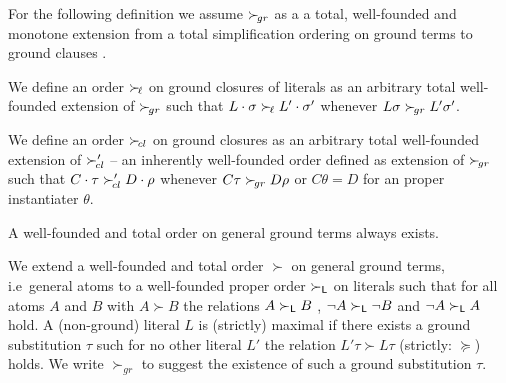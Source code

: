 For the following definition we assume
$\mathrel\succ_{\!gr}$ as a a total, well-founded and monotone extension
from a total simplification ordering on ground terms
to ground clauses \cite{NR2001}.

\begin{definition}
    We define an order $\mathrel\succ_{\!\ell}$ on ground closures of literals
    as an arbitrary total well-founded extension of $\mathrel\succ_{\!gr}$
    such that
    $L\cdot\sigma\mathrel\succ_{\!\ell} L'\cdot\sigma'$ whenever
    $L\sigma\mathrel\succ_{\!gr} L'\sigma'$.

    We define an order \( \mathrel\succ_{\!cl} \) on ground closures
    as an arbitrary total well-founded extension of
    $\mathrel\succ_{\!cl}'$ -- an inherently well-founded order defined as extension of $\mathrel\succ_{\!gr}$
    such that
    $C\cdot\tau\mathrel\succ_{\!cl}' D\cdot\rho$ whenever
    $C\tau\mathrel\succ_{\!gr} D\rho$ or $C\theta = D$ for an proper instantiater $\theta$.
\end{definition}

\begin{lemma}A well-founded and total order on general ground terms always exists.\end{lemma}

	\begin{definition}\label{def:orders-on-literals}
		We extend a well-founded and total order $\succ$ on general ground terms,
		i.e~general atoms to a well-founded proper order $\succ_{\mathsf{L}}$
		on literals such that for all atoms $A$ and $B$ with $A\succ B$
		the relations $A\succ_{\mathsf{L}} B$ ,
		$\lnot A\succ_{\mathsf{L}}\lnot B$ and
		$\lnot A\succ_{\mathsf{L}} A$ hold.
		A (non-ground) literal $L$ is {\myem (strictly) maximal} if there exists a ground substitution $\tau$
		such for no other literal $L'$ the relation $L'\tau\succ L\tau$ (strictly: $\succcurlyeq$) holds.
		We write $\succ_{gr}$ to suggest the existence of such a ground substitution $\tau$.
	\end{definition}



